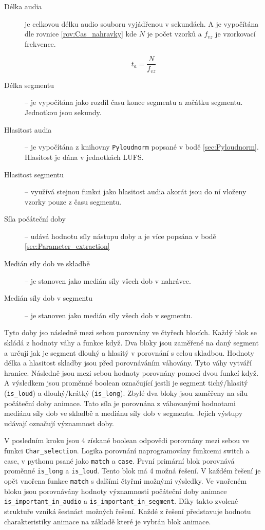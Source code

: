 \begin{description}
    \item[Délka audia] je celkovou délku audio souboru vyjádřenou v sekundách. A je vypočítána dle rovnice \ref{rov:Cas_nahravky} kde $N$ je počet vzorků a $f_{vz}$ je vzorkovací frekvence. 

    \begin{equation}
        t_{a} = \frac{N}{f_{vz}}
        \label{rov:Cas_nahravky}
    \end{equation}

    \item[Délka segmentu] -- je vypočítána jako rozdíl času konce segmentu a začátku segmentu. Jednotkou jsou sekundy. 
    \item[Hlasitost audia] -- je vypočítána z knihovny \texttt{Pyloudnorm} popsané v bodě \ref{sec:Pyloudnorm}. Hlasitost je dána v jednotkách LUFS.
    \item[Hlasitost segmentu] -- využívá stejnou funkci jako hlasitost audia akorát jsou do ní vloženy vzorky pouze z času segmentu. 
    \item[Síla počáteční doby] -- udává hodnotu síly nástupu doby a je více popsána v bodě \ref{sec:Parameter_extraction}
    \item[Medián síly dob ve skladbě] -- je stanoven jako medián síly všech dob v nahrávce. 
    \item[Medián síly dob v segmentu] -- je stanoven jako medián  síly všech dob v segmentu. 
\end{description}
Tyto doby jso následně mezi sebou porovnány ve čtyřech blocích. Každý blok se skládá z hodnoty váhy a funkce když. Dva bloky jsou zaměřené na daný segment a určují jak je segment dlouhý a hlasitý v porovnání s celou skladbou. Hodnoty délka a hlasitost skladby jsou před porovnáváním váhovány. Tyto váhy vytváří hranice. Následně jsou mezi sebou hodnoty porovnány pomocí dvou funkcí když. A výsledkem jsou proměnné boolean označující jestli je segment tichý/hlasitý (\texttt{is\_loud}) a dlouhý/krátký (\texttt{is\_long}). Zbylé dva bloky jsou zaměřeny na sílu počáteční doby animace. Tato síla je porovnána z váhovanými hodnotami mediánu síly dob ve skladbě a mediánu síly dob v segmentu. Jejich výstupy udávají označují významnost doby. 

V posledním kroku jsou 4 získané boolean odpovědi porovnány mezi sebou ve funkci \texttt{Char\_selection}. Logika porovnání naprogramovány funkcemi switch a case, v pythonu psané jako \texttt{match} a \texttt{case}. První primární blok porovnává proměnné \texttt{is\_long} a \texttt{is\_loud}. Tento blok má 4 možná řešení. V každém řešení je opět vnořena funkce \texttt{match} s dalšími čtyřmi možnými výsledky. Ve vnořeném bloku jsou porovnávány hodnoty významnosti počáteční doby animace \texttt{is\_important\_in\_audio} a \texttt{is\_important\_in\_segment}. Díky takto zvolené struktuře vzniká šestnáct možných řešení. Každé z řešení představuje hodnotu charakteristiky animace na základě které je vybrán blok animace. 

